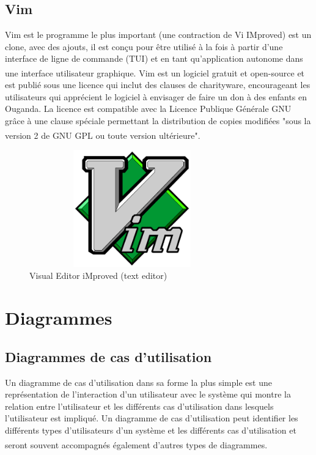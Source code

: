 \documentclass[12pt]{report}
\begin{document}
\subsection{Vim}
Vim est le programme le plus important (une contraction de Vi IMproved) est un clone, avec des ajouts, il est conçu pour être utilisé à la fois à partir d'une interface de ligne de commande (TUI) et en tant qu'application autonome dans une interface utilisateur graphique. Vim\textsuperscript{\cite{vim}} est un logiciel gratuit et open-source et est publié sous une licence qui inclut des clauses de charityware, encourageant les utilisateurs qui apprécient le logiciel à envisager de faire un don à des enfants en Ouganda. La licence est compatible avec la Licence Publique Générale GNU grâce à une clause spéciale permettant la distribution de copies modifiées "sous la version 2 de GNU GPL ou toute version ultérieure".\textsuperscript{\cite{schulz2007hacking}}

\vspace{0.2in}

\begin{figure}[h]
\centering
    \includegraphics[width = 3.5in, height = 2in]{../Images/Vim.png}
    \caption{Visual Editor iMproved (text editor)}
\end{figure}

\section{Diagrammes}

\subsection{Diagrammes de cas d'utilisation}

Un diagramme de cas d'utilisation dans sa forme la plus simple est une représentation de l'interaction d'un utilisateur avec le système qui montre la relation entre l'utilisateur et les différents cas d'utilisation dans lesquels l'utilisateur est impliqué. Un diagramme de cas d'utilisation peut identifier les différents types d'utilisateurs d'un système et les différents cas d'utilisation et seront souvent accompagnés également d'autres types de diagrammes.\textsuperscript{\cite{UIS}}
\end{document}

